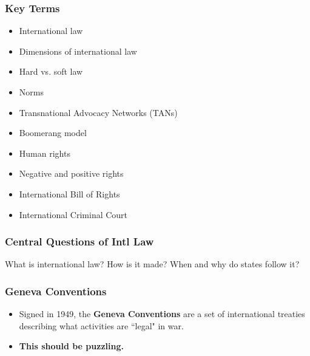 \documentclass[handout]{beamer}
\begin{document}
\begin{frame} 
	\frametitle{\LARGE{Key Terms}}
	\begin{itemize}
		\item International law
		\item Dimensions of international law
		\item Hard vs. soft law
		\item Norms
		\item Transnational Advocacy Networks (TANs)
		\item Boomerang model
		\item Human rights
		\item Negative and positive rights
		\item International Bill of Rights
		\item International Criminal Court
	\end{itemize}
\end{frame}

\begin{frame} 
	\frametitle{\LARGE{Central Questions of Intl Law}}
	\centering
	\Large{What is international law? How is it made? When and why do states follow it?}
\end{frame}


\begin{frame} 
	\frametitle{\LARGE{Geneva Conventions}}
	\begin{itemize}
		\item Signed in 1949, the \textbf{Geneva Conventions} are a set of international treaties describing what activities are ``legal" in war. \pause
		\item \textbf{This should be puzzling.}
	\end{itemize}
\end{frame}
\end{document}
